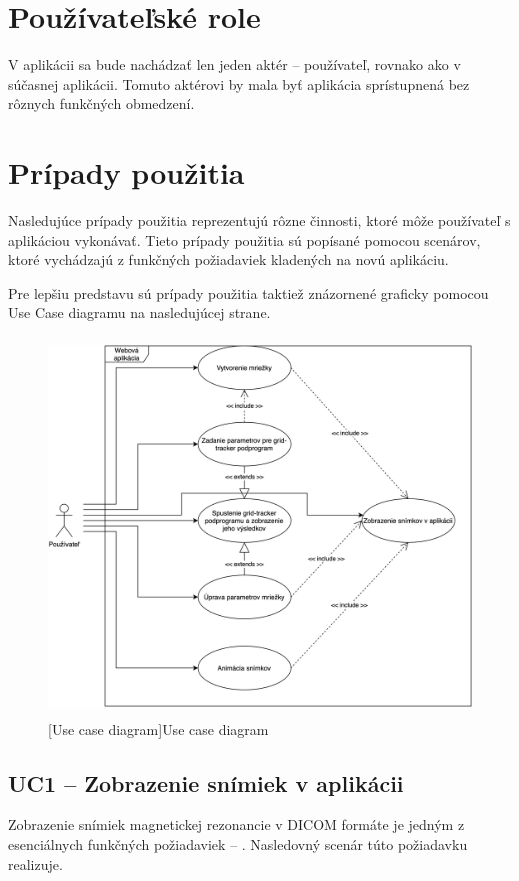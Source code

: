\section {Používateľské role}
V aplikácii sa bude nachádzať len jeden aktér -- používateľ, rovnako ako v súčasnej aplikácii. Tomuto aktérovi by mala byť aplikácia sprístupnená bez rôznych funkčných obmedzení.

\section {Prípady použitia}
Nasledujúce prípady použitia reprezentujú rôzne činnosti, ktoré môže používateľ s aplikáciou vykonávať. Tieto prípady použitia sú popísané pomocou scenárov, ktoré vychádzajú z funkčných požiadaviek kladených na novú aplikáciu.

Pre lepšiu predstavu sú prípady použitia taktiež znázornené graficky pomocou Use Case diagramu na nasledujúcej strane.

\begin {figure}[H]
        \centering
        \includegraphics[height=10cm]{media/graphs/usecase.png}
        \captionsetup{justification=centering}
        [Use case diagram]{Use case diagram}
\end {figure}

\subsection {UC1 -- Zobrazenie snímiek v aplikácii}\label{uc1}
Zobrazenie snímiek magnetickej rezonancie v DICOM formáte je jedným z esenciálnych funkčných požiadaviek -- . Nasledovný scenár túto požiadavku realizuje.

